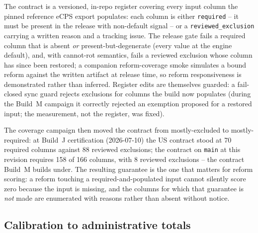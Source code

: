 The contract is a versioned, in-repo register covering every input column
the pinned reference eCPS export populates: each column is either
\texttt{required} -- it must be present in the release with non-default
signal -- or a \texttt{reviewed\_exclusion} carrying a written reason and
a tracking issue. The release gate fails a required column that is absent
\emph{or} present-but-degenerate (every value at the engine default), and,
with cannot-rot semantics, fails a reviewed exclusion whose column has
since been restored; a companion reform-coverage smoke simulates a bound
reform against the written artifact at release time, so reform
responsiveness is demonstrated rather than inferred. Register edits are
themselves guarded: a fail-closed sync guard rejects exclusions for
columns the build now populates (during the Build~M campaign it correctly
rejected an exemption proposed for a restored input; the measurement, not
the register, was fixed).

The coverage campaign then moved the contract from mostly-excluded to
mostly-required: at Build~J certification (2026-07-10) the US contract
stood at 70 required columns against 88 reviewed exclusions; the contract
on \texttt{main} at this revision requires 158 of 166 columns, with 8
reviewed exclusions -- the contract Build~M builds under. The resulting
guarantee is the one that matters for reform scoring: a reform touching a
required-and-populated input cannot silently score zero because the input
is missing, and the columns for which that guarantee is \emph{not} made
are enumerated with reasons rather than absent without notice.

\subsection{Calibration to administrative totals}
\label{sec:calibration}

